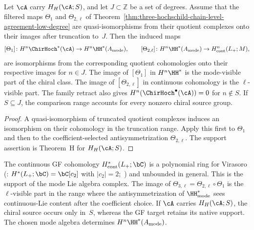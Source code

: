 \begin{theorem}
\label{thm:three-hochschild-cohomological-agreement-all-degree}
Let $\cA$ carry $H_H(\cA;S)$, and let $J\subset\mathbb Z$ be a set of
degrees.  Assume that the filtered maps
$\Theta_1$ and $\Theta_{2,\ell}$ of
Theorem~\ref{thm:three-hochschild-chain-level-agreement-low-degree}
are quasi-isomorphisms from their quotient complexes onto their images
after truncation to~$J$.  Then the induced maps
\[
 [\Theta_1]\colon H^n\ChirHoch^*(\cA)
 \to H^n\HH^*(A_{\mathrm{mode}}),
 \qquad
 [\Theta_{2,\ell}]\colon H^n\HH^*(A_{\mathrm{mode}})
 \to H^n_{\mathrm{cont}}(L_+;M),
\]
are isomorphisms from the corresponding quotient cohomologies onto
their respective images for $n\in J$. The image of
$[\Theta_1]$ in $H^n\HH^*$ is the mode-visible part of the chiral
class. The image of $[\Theta_{2,\ell}]$ in continuous cohomology is
the $\ell$-visible part.  The family retract also gives
$H^n(\ChirHoch^\bullet(\cA))=0$ for $n\notin S$.  If $S\subseteq J$,
the comparison range accounts for every nonzero chiral source group.
\end{theorem}

\begin{proof}
A quasi-isomorphism of truncated quotient complexes induces an
isomorphism on their cohomology in the truncation range.  Apply this
first to $\Theta_1$ and then to the coefficient-selected
antisymmetrization $\Theta_{2,\ell}$.  The support assertion is
Theorem~H for $H_H(\cA;S)$.
\end{proof}

\begin{remark}
\label{rem:GF-unbounded-but-image-bounded}
The continuous GF cohomology $H^*_{\mathrm{cont}}(L_+;\bC)$
is a polynomial ring for Virasoro (\cite[Theorem~1.4.3]{Fuks86}:
$H^*(L_+;\bC) = \bC[c_2]$ with $|c_2|=2$;~\cite{Goncharova73}) and
unbounded in general. This is the support of the mode Lie algebra
complex. The image of
$\Theta_{3,\ell} = \Theta_{2,\ell}\circ\Theta_1$ is the
$\ell$-visible part in the range where the
antisymmetrization of $\HH^*_{\mathrm{mode}}$ sees continuous-Lie
content after the coefficient choice.  If $\cA$ carries
$H_H(\cA;S)$, the chiral source occurs only in~$S$, whereas the GF
target retains its native support. The chosen mode algebra determines
$H^n\HH^*(A_{\mathrm{mode}})$.
\end{remark}

